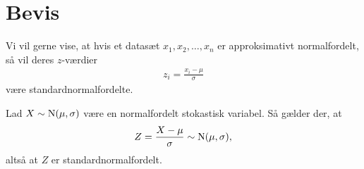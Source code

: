 
\section*{Bevis}

Vi vil gerne vise, at hvis et datasæt $x_1,x_2,\hdots,x_n$ er approksimativt normalfordelt, så vil deres $z$-værdier
\begin{align*}
	z_i = \frac{x_i-\mu}{\sigma}
\end{align*}
være standardnormalfordelte. 
\begin{setn}
	Lad $X\sim \textnormal{N}(\mu,\sigma)$ være en normalfordelt stokastisk variabel. Så gælder der, at
	\begin{align*}
		Z = \frac{X-\mu}{\sigma} \sim \textnormal{N}(\mu,\sigma),
	\end{align*}
	altså at $Z$ er standardnormalfordelt.
\end{setn}

